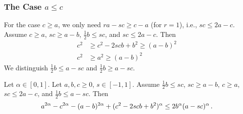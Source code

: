 \subsubsection{The Case $a\leq c$}
%
For the case $c\geq a$, we only need $ra - sc \geq c-a$	(for $r=1$), i.e., $sc \leq 2a - c$.
Assume $c\geq a$, $sc \geq a-b$, $\frac12b \leq sc$, and $sc \leq 2a - c$.
Then 
\begin{align*}
	c^2 &\geq c^2-2scb+b^2 \geq (a-b)^2\\
	c^2 &\geq a^2 \geq (a-b)^2
\end{align*}
We distinguish $\frac12 b \leq a-sc$ and $\frac12 b \geq a-sc$.
%
\begin{lemma}\label{lmm:bleqasc}
	Let $\alpha\in[0,1]$.
	Let $a,b,c\geq0$, $s\in[-1,1]$.
	Assume $\frac12 b \leq sc$, $sc \geq a-b$, $c\geq a$, $sc \leq 2a - c$, and $\frac12 b\leq a-sc$.
	Then
	\begin{equation*}
		a^{2\alpha}-c^{2\alpha}-(a-b)^{2\alpha}+(c^2 - 2 s c b + b^2)^\alpha 
		\leq  
		2 b^\alpha (a-sc)^{\alpha}
		\, .
	\end{equation*}
\end{lemma}
%
